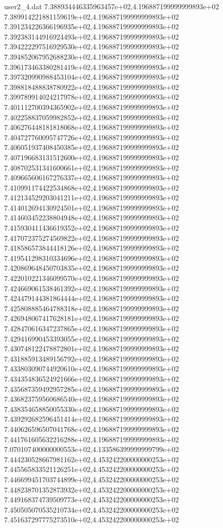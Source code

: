 \begin{filecontents}{user2_4.dat}
7.388934446335963457e+02,4.196887199999999893e+02
7.389914221881159619e+02,4.196887199999999893e+02
7.391234226366196935e+02,4.196887199999999893e+02
7.392383144916924493e+02,4.196887199999999893e+02
7.394222297516929530e+02,4.196887199999999893e+02
7.394852067952688230e+02,4.196887199999999893e+02
7.396173463380281419e+02,4.196887199999999893e+02
7.397320990988453104e+02,4.196887199999999893e+02
7.398818488838780922e+02,4.196887199999999893e+02
7.399789914024217978e+02,4.196887199999999893e+02
7.401112700394365902e+02,4.196887199999999893e+02
7.402258837059982852e+02,4.196887199999999893e+02
7.406276448181818068e+02,4.196887199999999893e+02
7.404727760095747726e+02,4.196887199999999893e+02
7.406051937408450385e+02,4.196887199999999893e+02
7.407196683131512600e+02,4.196887199999999893e+02
7.408702531341600661e+02,4.196887199999999893e+02
7.409665606167276337e+02,4.196887199999999893e+02
7.410991174422534868e+02,4.196887199999999893e+02
7.412134529203041211e+02,4.196887199999999893e+02
7.414012694130924501e+02,4.196887199999999893e+02
7.414603452238804948e+02,4.196887199999999893e+02
7.415930411436619352e+02,4.196887199999999893e+02
7.417072375274569822e+02,4.196887199999999893e+02
7.418586573844418126e+02,4.196887199999999893e+02
7.419541298310334696e+02,4.196887199999999893e+02
7.420869648450703835e+02,4.196887199999999893e+02
7.422010221346099570e+02,4.196887199999999893e+02
7.424669061538461392e+02,4.196887199999999893e+02
7.424479144381864444e+02,4.196887199999999893e+02
7.425808885464788318e+02,4.196887199999999893e+02
7.426948067417628181e+02,4.196887199999999893e+02
7.428470616347237865e+02,4.196887199999999893e+02
7.429416990453393055e+02,4.196887199999999893e+02
7.430748122478872801e+02,4.196887199999999893e+02
7.431885913489156792e+02,4.196887199999999893e+02
7.433803090744920610e+02,4.196887199999999893e+02
7.434354836524921666e+02,4.196887199999999893e+02
7.435687359492957285e+02,4.196887199999999893e+02
7.436823759560686540e+02,4.196887199999999893e+02
7.438354658850055330e+02,4.196887199999999893e+02
7.439292682596451414e+02,4.196887199999999893e+02
7.440626596507041768e+02,4.196887199999999893e+02
7.441761605632216288e+02,4.196887199999999893e+02
7.070107400000000553e+02,4.133586399999999799e+02
7.444230528667981162e+02,4.453242200000000253e+02
7.445565833521126251e+02,4.453242200000000253e+02
7.446699451703744899e+02,4.453242200000000253e+02
7.448238701352873932e+02,4.453242200000000253e+02
7.449168374739509773e+02,4.453242200000000253e+02
7.450505070535210734e+02,4.453242200000000253e+02
7.451637297775273510e+02,4.453242200000000253e+02

\end{filecontents}
